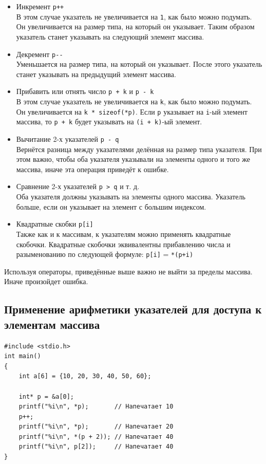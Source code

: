 \documentclass[10pt]{article}
\begin{document}
\begin{itemize}
\item Инкремент \texttt{p++}\\
В этом случае указатель не увеличивается на \texttt{1}, как было можно подумать. Он увеличивается на размер типа, на который он указывает. Таким образом указатель станет указывать на следующий элемент массива.

\item Декремент \texttt{p-{}-}\\
Уменьшается на размер типа, на который он указывает. После этого указатель станет указывать на предыдущий элемент массива.

\item Прибавить или отнять число \texttt{p + k} и \texttt{p - k}\\
В этом случае указатель не увеличивается на \texttt{k}, как было можно подумать. Он увеличивается на \texttt{k * sizeof(*p)}. Если \texttt{p} указывает на \texttt{i}-ый элемент массива, то \texttt{p + k} будет указывать на \texttt{(i + k)}-ый элемент.

\item Вычитание 2-х указателей \texttt{p - q}\\
Вернётся разница между указателями делённая на размер типа указателя.
При этом важно, чтобы оба указателя указывали на элементы одного и того же массива, иначе эта операция приведёт к ошибке.

\item Сравнение 2-х указателей \texttt{p > q} и т. д.\\
Оба указателя должны указывать на элементы одного массива. Указатель больше, если он указывает на элемент с большим индексом.

\item Квадратные скобки \texttt{p[i]}\\
Также как и к массивам, к указателям можно применять квадратные скобочки. Квадратные скобочки эквивалентны прибавлению числа и разыменованию по следующей формуле: \texttt{p[i]} = \texttt{*(p+i)}
\end{itemize}

Используя операторы, приведённые выше важно не выйти за пределы массива. Иначе произойдет ошибка. 

\subsection*{Применение арифметики указателей для доступа к элементам массива}
\begin{lstlisting}
#include <stdio.h>
int main() 
{
    int a[6] = {10, 20, 30, 40, 50, 60};
    
    int* p = &a[0];
    printf("%i\n", *p);       // Напечатает 10
    p++;
    printf("%i\n", *p);       // Напечатает 20
    printf("%i\n", *(p + 2)); // Напечатает 40
    printf("%i\n", p[2]);     // Напечатает 40
}
\end{lstlisting}
\end{document}
